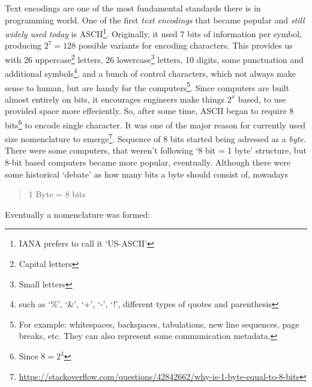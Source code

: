 \documentclass{report}
\begin{document}
            Text encodings are one of the most fundamental standards there is in programming world. One of the first \emph{text encodings} that became popular and \emph{still widely
            used today} is ASCII\footnote{IANA prefers to call it `US-ASCII'}. Originally, it used 7 bits of information per symbol, producing $2^7 = 128$ possible 
            variants for encoding characters. This provides us with 26 uppercase\footnote{Capital letters} letters, 26 lowercase\footnote{Small letters} letters, 10 digits, some punctuation
            and additional symbols\footnote{such as `\%', `\&', `+', `-', `!', different types of quotes and parenthesis}, and a bunch of control characters, which not always make sense to human,
            but are handy for the computers\footnote{For example: whitespaces, backspaces, tabulations, new line sequences, page breaks, etc. They can also represent some communication metadata.}.
            Since computers are built almost entirely on bits, it encourages engineers make things $2^x$ based, to use provided space more effeciently. So, after some time, ASCII
            began to require 8 bits\footnote{Since $8 = 2^3$} to encode single character. It was one of the major reason for currently used size nomenclature to 
            emerge\footnote{\href{https://stackoverflow.com/questions/42842662/why-is-1-byte-equal-to-8-bits}{https://stackoverflow.com/questions/42842662/why-is-1-byte-equal-to-8-bits}}.
            Sequence of 8 bits started being adressed as a \emph{byte}. There were some computers, that weren't following `8 bit = 1 byte' structure, but 8-bit based
            computers became more popular, eventually. Although there were some historical `debate' as how many bits a byte should consist of, nowadays 
            
            \begin{quote}
                \begin{center}
                    1 Byte = 8 bits                                    
                \end{center}
            \end{quote}

            Eventually a nomenclature was formed: 
\end{document}
